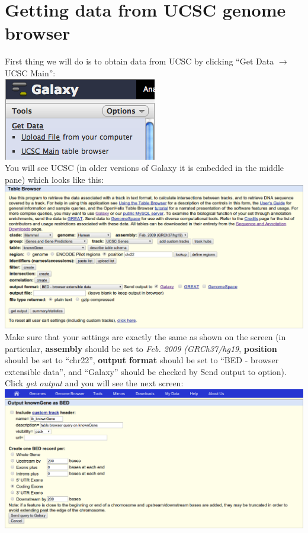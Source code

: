 \documentclass[11pt,a4paper]{article}
\begin{document}
\section{Getting data from UCSC genome browser}
First thing we will do is to obtain data from UCSC by clicking ``Get Data $\rightarrow$ UCSC Main'':\\
\includegraphics[scale=0.65]{figures/101_01} \\
You will see UCSC (in older versions of Galaxy it is embedded in the middle pane) which looks like this:\\
\includegraphics[width=\textwidth]{figures/101_02} \\
Make sure that your settings are exactly the same as shown on the screen (in particular, \textbf{assembly} should be set to \textit{Feb. 2009 (GRCh37/hg19}, \textbf{position} should be set to ``chr22'', \textbf{output format} should be set to ``BED - browser extensible data'', and ``Galaxy'' should be checked by Send output to option). Click \textit{get output} and you will see the next screen:\\
\includegraphics[width=\textwidth]{figures/101_03}\\
\end{document}
